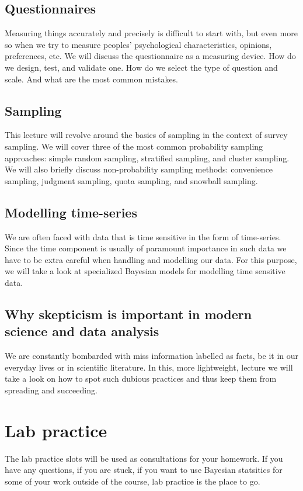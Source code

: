 \documentclass[fleqn,moreauthors,10pt]{ds_report}
\begin{document}
\subsection*{Questionnaires}

Measuring things accurately and precisely is difficult to start with, but even more so when we try to measure peoples' psychological characteristics, opinions, preferences, etc. We will discuss the questionnaire as a measuring device. How do we design, test, and validate one. How do we select the type of question and scale. And what are the most common mistakes.

\subsection*{Sampling}

This lecture will revolve around the basics of sampling in the context of survey sampling. We will cover three of the most common probability sampling approaches: simple random sampling, stratified sampling, and cluster sampling. We will also briefly discuss non-probability sampling methods: convenience sampling, judgment sampling, quota sampling, and snowball sampling.

\subsection*{Modelling time-series}

We are often faced with data that is time sensitive in the form of time-series. Since the time component is usually of paramount importance in such data we have to be extra careful when handling and modelling our data. For this purpose, we will take a look at specialized Bayesian models for modelling time sensitive data.

\subsection*{Why skepticism is important in modern science and data analysis}

We are constantly bombarded with miss information labelled as facts, be it in our everyday lives or in scientific literature. In this, more lightweight, lecture we will take a look on how to spot such dubious practices and thus keep them from spreading and succeeding.

\section*{Lab practice}

The lab practice slots will be used as consultations for your homework. If you have any questions, if you are stuck, if you want to use Bayesian statsitics for some of your work outside of the course, lab practice is the place to go.
\end{document}
